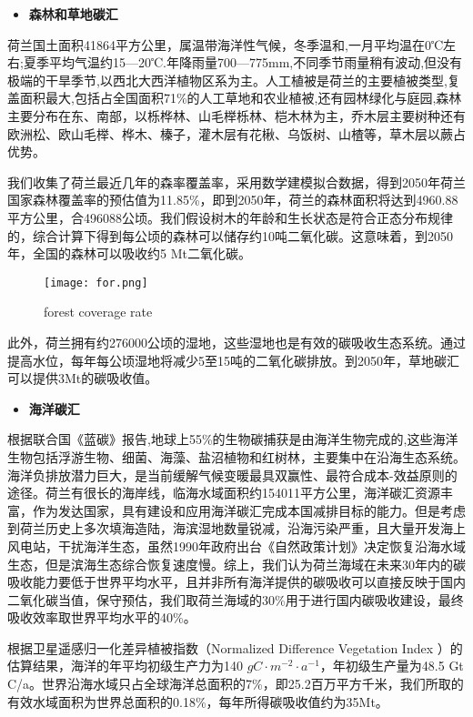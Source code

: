 \documentclass[bwprint]{gmcmthesis}
\numberwithin{figure}{section}
\newcommand{\upcite}[1]{\textsuperscript{\textsuperscript{\cite{#1}}}}
\begin{document}
\begin{itemize}
	\item \textbf{森林和草地碳汇}
\end{itemize}

荷兰国土面积41864平方公里，属温带海洋性气候，冬季温和,一月平均温在0℃左右;夏季平均气温约15—20℃.年降雨量700—775mm,不同季节雨量稍有波动,但没有极端的干旱季节,以西北大西洋植物区系为主。人工植被是荷兰的主要植被类型,复盖面积最大,包括占全国面积71\%的人工草地和农业植被,还有园林绿化与庭园,森林主要分布在东、南部，以栎桦林、山毛榉栎林、桤木林为主，乔木层主要树种还有欧洲松、欧山毛榉、桦木、榛子，灌木层有花楸、乌饭树、山楂等，草木层以蕨占优势。\upcite{2-1}

我们收集了荷兰最近几年的森率覆盖率，采用数学建模拟合数据，得到2050年荷兰国家森林覆盖率的预估值为11.85\%，即到2050年，荷兰的森林面积将达到4960.88平方公里，合496088公顷。我们假设树木的年龄和生长状态是符合正态分布规律的，综合计算下得到每公顷的森林可以储存约10吨二氧化碳。这意味着，到2050年，全国的森林可以吸收约5 Mt二氧化碳。
\begin{figure}[!h]
	\centering
	\texttt{[image: for.png]}
	\caption{forest coverage rate}
	\label{for}
\end{figure}

此外，荷兰拥有约276000公顷的湿地，这些湿地也是有效的碳吸收生态系统。通过提高水位，每年每公顷湿地将减少5至15吨的二氧化碳排放。到2050年，草地碳汇可以提供3Mt的碳吸收值。

\begin{itemize}
	\item \textbf{海洋碳汇}
\end{itemize}

根据联合国《蓝碳》报告,地球上55\%的生物碳捕获是由海洋生物完成的,这些海洋生物包括浮游生物、细菌、海藻、盐沼植物和红树林，主要集中在沿海生态系统。海洋负排放潜力巨大，是当前缓解气候变暖最具双赢性、最符合成本-效益原则的途径。荷兰有很长的海岸线，临海水域面积约154011平方公里，海洋碳汇资源丰富，作为发达国家，具有建设和应用海洋碳汇完成本国减排目标的能力。但是考虑到荷兰历史上多次填海造陆，海滨湿地数量锐减，沿海污染严重，且大量开发海上风电站，干扰海洋生态，虽然1990年政府出台《自然政策计划》决定恢复沿海水域生态，但是滨海生态综合恢复速度慢。综上，我们认为荷兰海域在未来30年内的碳吸收能力要低于世界平均水平，且并非所有海洋提供的碳吸收可以直接反映于国内二氧化碳当值，保守预估，我们取荷兰海域的30\%用于进行国内碳吸收建设，最终吸收效率取世界平均水平的40\%。\upcite{2-2}

根据卫星遥感归一化差异植被指数（Normalized Difference Vegetation Index ）的估算结果，海洋的年平均初级生产力为140 $g$\quad$C·m^{-2}·a^{-1}$，年初级生产量为48.5 Gt C/a。\upcite{2-3}世界沿海水域只占全球海洋总面积的7\%，即25.2百万平方千米，我们所取的有效水域面积为世界总面积的0.18\%，每年所得碳吸收值约为35Mt。
\end{document}
